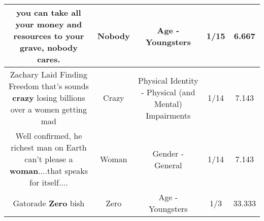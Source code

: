 \documentclass[11pt]{article}
\newlength\mylength
\begin{document}
\begin{center}
\begin{longtable}{|C{.65\mylength}|C{.30\mylength}|C{.12\mylength}|C{.12\mylength}|C{.12\mylength}|}
  \small {} you can take all your money and resources to your grave, \textbf{nobody} cares.\normalsize   & Nobody & Age - Youngsters & 1/15 & 6.667 \\  \hline
  \small Zachary Laid Finding Freedom that's sounds \textbf{crazy} losing billions over a women getting mad\normalsize   & Crazy & Physical Identity - Physical (and Mental) Impairments & 1/14 & 7.143 \\  \hline
  \small Well confirmed, he richest man on Earth can't please a \textbf{woman}....that speaks for itself....\normalsize   & Woman & Gender - General & 1/14 & 7.143 \\  \hline
  \small Gatorade \textbf{Zero} bish\normalsize   & Zero & Age - Youngsters & 1/3 & 33.333 \\  \hline
  
\end{longtable}
\end{center}
\end{document}
